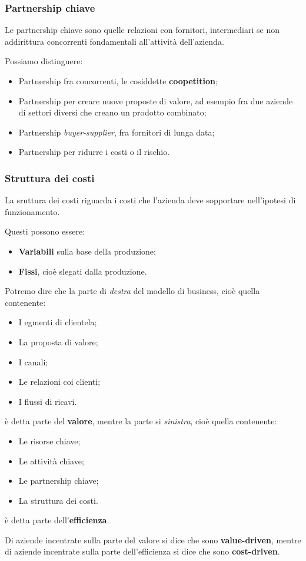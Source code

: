 \documentclass[a4paper,11pt]{article}
\begin{document}
\subsubsection{Partnership chiave}
Le partnership chiave sono quelle relazioni con fornitori, intermediari se non addirittura concorrenti fondamentali all'attività dell'azienda. 

Possiamo distinguere:
\begin{itemize}
	\item Partnership fra concorrenti, le cosiddette \textbf{coopetition};
	\item Partnership per creare nuove proposte di valore, ad esempio fra due aziende di settori diversi che creano un prodotto combinato;
	\item Partnership \textit{buyer-supplier}, fra fornitori di lunga data;
	\item Partnership per ridurre i costi o il rischio.
\end{itemize}

\subsubsection{Struttura dei costi}
La sruttura dei costi riguarda i costi che l'azienda deve sopportare nell'ipotesi di funzionamento.

Questi possono essere:
\begin{itemize}
	\item \textbf{Variabili} sulla base della produzione;
	\item \textbf{Fissi}, cioè slegati dalla produzione.
\end{itemize}

Potremo dire che la parte di \textit{destra} del modello di business, cioè quella contenente:
\begin{itemize}
	\item I egmenti di clientela;
	\item La proposta di valore;
	\item I canali;
	\item Le relazioni coi clienti;
	\item I flussi di ricavi.
\end{itemize}
è detta parte del \textbf{valore}, mentre la parte si \textit{sinistra}, cioè quella contenente:
\begin{itemize}
	\item Le risorse chiave;
	\item Le attività chiave;
	\item Le partnership chiave;
	\item La struttura dei costi.
\end{itemize}
è detta parte dell'\textbf{efficienza}.

Di aziende incentrate sulla parte del valore si dice che sono \textbf{value-driven}, mentre di aziende incentrate sulla parte dell'efficienza si dice che sono \textbf{cost-driven}.
\end{document}
